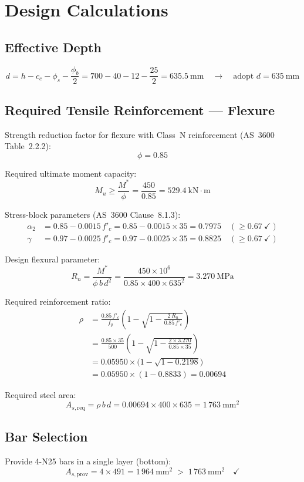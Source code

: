 \section{Design Calculations}

\subsection{Effective Depth}
\[
d = h - c_c - \phi_s - \frac{\phi_b}{2}
  = 700 - 40 - 12 - \frac{25}{2}
  = 635.5\ \text{mm} \quad\rightarrow\quad \text{adopt } d = 635\ \text{mm}
\]

\subsection{Required Tensile Reinforcement --- Flexure}
Strength reduction factor for flexure with Class~N reinforcement (AS~3600 Table~2.2.2):
\[
\phi = 0.85
\]

Required ultimate moment capacity:
\[
M_u \geq \frac{M^*}{\phi} = \frac{450}{0.85} = 529.4\ \text{kN}\!\cdot\!\text{m}
\]

Stress-block parameters (AS~3600 Clause~8.1.3):
\begin{align*}
\alpha_2 &= 0.85 - 0.0015\,f'_c = 0.85 - 0.0015 \times 35 = 0.7975 \quad (\geq 0.67\ \checkmark) \\
\gamma   &= 0.97 - 0.0025\,f'_c = 0.97 - 0.0025 \times 35 = 0.8825 \quad (\geq 0.67\ \checkmark)
\end{align*}

Design flexural parameter:
\[
R_n = \frac{M^*}{\phi\,b\,d^2}
     = \frac{450 \times 10^6}{0.85 \times 400 \times 635^2}
     = 3.270\ \text{MPa}
\]

Required reinforcement ratio:
\begin{align*}
\rho &= \frac{0.85\,f'_c}{f_y}\left(1 - \sqrt{1 - \frac{2\,R_n}{0.85\,f'_c}}\right) \\
     &= \frac{0.85 \times 35}{500}\left(1 - \sqrt{1 - \frac{2 \times 3.270}{0.85 \times 35}}\right) \\
     &= 0.05950 \times \bigl(1 - \sqrt{1 - 0.2198}\bigr) \\
     &= 0.05950 \times (1 - 0.8833) = 0.00694
\end{align*}

Required steel area:
\[
A_{s,\text{req}} = \rho\,b\,d = 0.00694 \times 400 \times 635 = 1\,763\ \text{mm}^2
\]

\subsection{Bar Selection}
Provide 4-N25 bars in a single layer (bottom):
\[
A_{s,\text{prov}} = 4 \times 491 = 1\,964\ \text{mm}^2 \;>\; 1\,763\ \text{mm}^2 \quad\checkmark
\]

